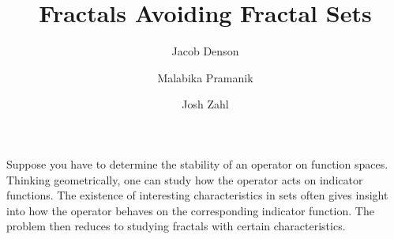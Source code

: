 \documentclass{article}
\title{Fractals Avoiding Fractal Sets}
\author{Jacob Denson\\ \and Malabika Pramanik\\ \and Josh Zahl}
\theoremstyle{plain}
\theoremstyle{plain}
\begin{document}
\maketitle


\begin{abstract}
	\blindtext[1]
\end{abstract}


Suppose you have to determine the stability of an operator on function spaces. Thinking geometrically, one can study how the operator acts on indicator functions. The existence of interesting characteristics in sets often gives insight into how the operator behaves on the corresponding indicator function. The problem then reduces to studying fractals with certain characteristics.
%


\end{document}
